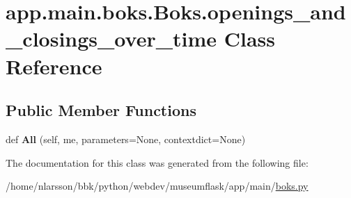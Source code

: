 \hypertarget{classapp_1_1main_1_1boks_1_1Boks_1_1openings__and__closings__over__time}{}\section{app.\+main.\+boks.\+Boks.\+openings\+\_\+and\+\_\+closings\+\_\+over\+\_\+time Class Reference}
\label{classapp_1_1main_1_1boks_1_1Boks_1_1openings__and__closings__over__time}
\subsection*{Public Member Functions}
\begin{DoxyCompactItemize}
\item 
\mbox{\label{classapp_1_1main_1_1boks_1_1Boks_1_1openings__and__closings__over__time_a714db20015add5cfdd4d41fefb2cfa61}} 
def {\bfseries All} (self, me, parameters=None, contextdict=None)
\end{DoxyCompactItemize}


The documentation for this class was generated from the following file\+:\begin{DoxyCompactItemize}
\item 
/home/nlarsson/bbk/python/webdev/museumflask/app/main/\mbox{\hyperlink{boks_8py}{boks.\+py}}\end{DoxyCompactItemize}
